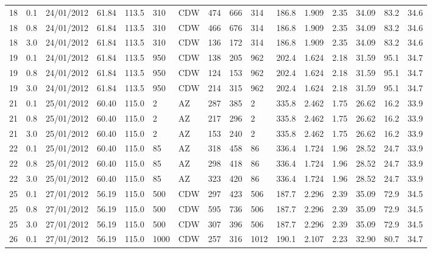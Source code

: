 {\begin{landscape}
\begin{longtable}{llllllllllllllll}
18 & 0.1 & 24/01/2012 & \textminus{}61.84 & 113.5 & 310 & CDW & 474 & 666 & 314 & 186.8 & 1.909 & 2.35 & 34.09 & 83.2 & 34.6\\
18 & 0.8 & 24/01/2012 & \textminus{}61.84 & 113.5 & 310 & CDW & 466 & 676 & 314 & 186.8 & 1.909 & 2.35 & 34.09 & 83.2 & 34.6\\
18 & 3.0 & 24/01/2012 & \textminus{}61.84 & 113.5 & 310 & CDW & 136 & 172 & 314 & 186.8 & 1.909 & 2.35 & 34.09 & 83.2 & 34.6\\
19 & 0.1 & 24/01/2012 & \textminus{}61.84 & 113.5 & 950 & CDW & 138 & 205 & 962 & 202.4 & 1.624 & 2.18 & 31.59 & 95.1 & 34.7\\
19 & 0.8 & 24/01/2012 & \textminus{}61.84 & 113.5 & 950 & CDW & 124 & 153 & 962 & 202.4 & 1.624 & 2.18 & 31.59 & 95.1 & 34.7\\
19 & 3.0 & 24/01/2012 & \textminus{}61.84 & 113.5 & 950 & CDW & 214 & 315 & 962 & 202.4 & 1.624 & 2.18 & 31.59 & 95.1 & 34.7\\
21 & 0.1 & 25/01/2012 & \textminus{}60.40 & 115.0 & 2 & AZ & 287 & 385 & 2 & 335.8 & 2.462 & 1.75 & 26.62 & 16.2 & 33.9\\
21 & 0.8 & 25/01/2012 & \textminus{}60.40 & 115.0 & 2 & AZ & 217 & 296 & 2 & 335.8 & 2.462 & 1.75 & 26.62 & 16.2 & 33.9\\
21 & 3.0 & 25/01/2012 & \textminus{}60.40 & 115.0 & 2 & AZ & 153 & 240 & 2 & 335.8 & 2.462 & 1.75 & 26.62 & 16.2 & 33.9\\
22 & 0.1 & 25/01/2012 & \textminus{}60.40 & 115.0 & 85 & AZ & 318 & 458 & 86 & 336.4 & 1.724 & 1.96 & 28.52 & 24.7 & 33.9\\
22 & 0.8 & 25/01/2012 & \textminus{}60.40 & 115.0 & 85 & AZ & 298 & 418 & 86 & 336.4 & 1.724 & 1.96 & 28.52 & 24.7 & 33.9\\
22 & 3.0 & 25/01/2012 & \textminus{}60.40 & 115.0 & 85 & AZ & 323 & 420 & 86 & 336.4 & 1.724 & 1.96 & 28.52 & 24.7 & 33.9\\
25 & 0.1 & 27/01/2012 & \textminus{}56.19 & 115.0 & 500 & CDW & 297 & 423 & 506 & 187.7 & 2.296 & 2.39 & 35.09 & 72.9 & 34.5\\
25 & 0.8 & 27/01/2012 & \textminus{}56.19 & 115.0 & 500 & CDW & 595 & 736 & 506 & 187.7 & 2.296 & 2.39 & 35.09 & 72.9 & 34.5\\
25 & 3.0 & 27/01/2012 & \textminus{}56.19 & 115.0 & 500 & CDW & 307 & 396 & 506 & 187.7 & 2.296 & 2.39 & 35.09 & 72.9 & 34.5\\
26 & 0.1 & 27/01/2012 & \textminus{}56.19 & 115.0 & 1000 & CDW & 257 & 316 & 1012 & 190.1 & 2.107 & 2.23 & 32.90 & 80.7 & 34.7\\

\end{longtable}
\end{landscape}}
